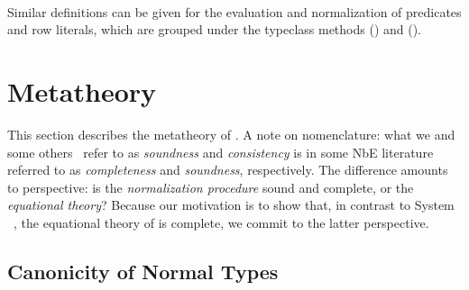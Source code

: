 \documentclass[sigplan,screen]{acmart}
\newif\ifmetatheory\metatheorytrue
\begin{document}
\begin{AgdaAlign}
\begin{code}%
%
\>[2]\AgdaSpace{}%
\AgdaSymbol{:}\AgdaSpace{}%
\AgdaSpace{}%
\AgdaSpace{}%
\AgdaSpace{}%
\AgdaSpace{}%
\AgdaSpace{}%
\AgdaSpace{}%
\<%
\\
%
\>[2]\AgdaSpace{}%
\AgdaSpace{}%
\AgdaSymbol{=}\AgdaSpace{}%
\AgdaSpace{}%
\AgdaSymbol{(}\AgdaSpace{}%
\AgdaSpace{}%
\AgdaSpace{}%
\AgdaSymbol{)}\<%
\end{code}
\end{AgdaAlign}

\Ni Similar definitions can be given for the evaluation and normalization of predicates and row literals, which are grouped under the typeclass methods  () and  ().
\fi


\section{Metatheory}
\label{sec:metatheory}
\ifmetatheory

This section describes the metatheory of \Rome. A note on nomenclature: what we and some others~\citep{Lindley05, Friedman75, KellerA10} refer to as \emph{soundness} and \emph{consistency} is in some NbE literature~\citep{Statman82, BergerS91, ChapmanKNW19, Abel13} referred to as \emph{completeness} and \emph{soundness}, respectively. The difference amounts to perspective: is the \emph{normalization procedure} sound and complete, or the \emph{equational theory}? Because our motivation is to show that, in contrast to System \RO~\citep{HubersM23}, the equational theory of \Rome{} is complete, we commit to the latter perspective.

\subsection{Canonicity of Normal Types}
\begin{AgdaAlign}
\begin{code}[hide]%
\>[0]\AgdaSpace{}%
\AgdaSpace{}%
\<%
\\
\>[0][@{}l@{\AgdaIndent{0}}]%
\>[2]\AgdaSpace{}%
\AgdaSpace{}%
\AgdaSpace{}%
\AgdaSymbol{;}\AgdaSpace{}%
\AgdaSpace{}%
\AgdaSpace{}%
\<%
\\
%
\>[2]\AgdaSpace{}%
\AgdaSpace{}%
\<%
\end{code}
\end{AgdaAlign}
\end{document}
